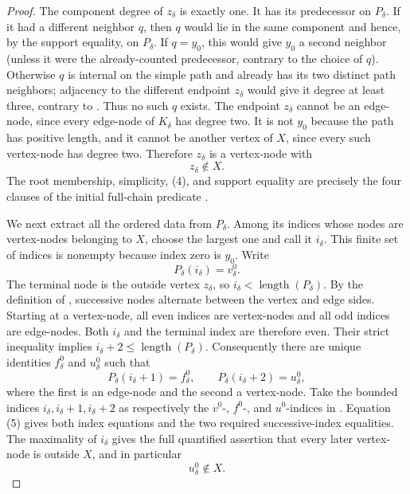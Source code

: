 \begin{proof}
The component degree of $z_\delta$ is exactly one.  It has its predecessor
on $P_\delta$.  If it had a different neighbor $q$, then $q$ would lie in
the same component and hence, by the support equality, on $P_\delta$.  If
$q=y_0$, this would give $y_0$ a second neighbor (unless it were the
already-counted predecessor, contrary to the choice of $q$).  Otherwise
$q$ is internal on the simple path and already has its two distinct path
neighbors; adjacency to the different endpoint $z_\delta$ would give it
degree at least three, contrary to
.  Thus no such $q$ exists.
The endpoint $z_\delta$ cannot be an edge-node, since every edge-node of
$K_\delta$ has degree two.  It is not $y_0$ because the path has positive
length, and it cannot be another vertex of $X$, since every such
vertex-node has degree two.  Therefore $z_\delta$ is a vertex-node with
\[
 z_\delta\notin X. \tag{4}
\]
The root membership, simplicity, (4), and support equality are precisely
the four clauses of the initial full-chain predicate
.

We next extract all the ordered data from $P_\delta$.  Among its indices
whose nodes are vertex-nodes belonging to $X$, choose the largest one and
call it $i_\delta$.  This finite set of indices is nonempty because index
zero is $y_0$.  Write
\[
 P_\delta(i_\delta)=v^0_\delta.
\]
The terminal node is the outside vertex $z_\delta$, so
$i_\delta<\operatorname{length}(P_\delta)$.  By the definition of
, successive nodes alternate between the
vertex and edge sides.  Starting at a vertex-node, all even indices are
vertex-nodes and all odd indices are edge-nodes.  Both $i_\delta$ and the
terminal index are therefore even.  Their strict inequality implies
$i_\delta+2\leq\operatorname{length}(P_\delta)$.  Consequently there are
unique identities $f^0_\delta$ and $u^0_\delta$ such that
\[
 P_\delta(i_\delta+1)=f^0_\delta,\qquad
 P_\delta(i_\delta+2)=u^0_\delta, \tag{5}
\]
where the first is an edge-node and the second a vertex-node.  Take the
bounded indices $i_\delta,i_\delta+1,i_\delta+2$ as respectively the
$v^0$-, $f^0$-, and $u^0$-indices in
.  Equation (5) gives both index equations
and the two required successive-index equalities.  The maximality of
$i_\delta$ gives the full quantified assertion that every later
vertex-node is outside $X$, and in particular
\[
 u^0_\delta\notin X. \tag{6}
\]


\end{proof}
